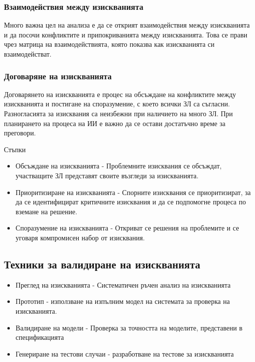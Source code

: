\documentclass[fleqn,12pt]{article}
\begin{document}
\subsubsection{Взаимодействия между изискванията}
Много важна цел на анализа е да се открият взаимодействия между изискванията и да посочи конфликтите и припокриванията между изискванията. Това се прави чрез матрица на взаимодействията, която показва как изискванията си взаимодействат.

\subsubsection{Договаряне на изискванията}
Договарянето на изискванията е процес на обсъждане на конфликтите между изискванията и постигане на споразумение, с което всички ЗЛ са съгласни. Разногласията за изисквания са неизбежни при наличието на много ЗЛ. При планирането на процеса на ИИ е важно да се остави достатъчно време за преговори.

Стъпки
\begin{itemize}
	\item Обсъждане на изискванията - Проблемните изисквания се обсъждат, участващите ЗЛ представят своите възгледи за изискванията.
	\item Приоритизиране на изискванията - Спорните изисквания се приоритизират, за да се идентифицират критичните изисквания и да се подпомогне процеса по вземане на решение.
	\item Споразумение на изискванията - Откриват се решения на проблемите и се уговаря компромисен набор от изисквания.
\end{itemize}

\subsection{Техники за валидиране на изискванията}

\begin{itemize}
	\item Преглед на изискванията - Систематичен ръчен анализ на изискванията 
	\item Прототип - използване на изпълним модел на системата за проверка на изискванията.
	\item Валидиране на модели - Проверка за точността на моделите, представени в спецификацията
	\item Генериране на тестови случаи - разработване на тестове за изискванията
\end{itemize}
\end{document}
